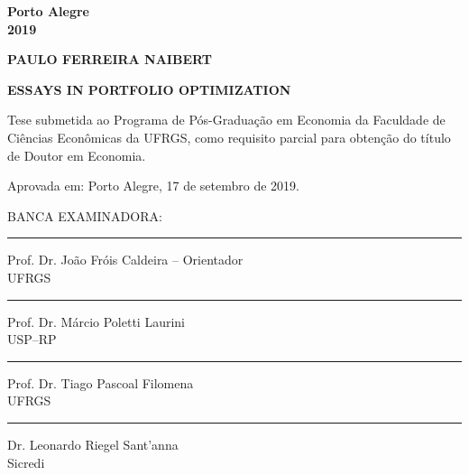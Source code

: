 \documentclass[12pt,oneside,a4paper]{memoir}
\begin{document}
\begin{center}
\textbf{Porto Alegre
\\
2019}
\end{center}

\clearpage
% 

\clearpage

\begin{center}
\textbf{PAULO FERREIRA NAIBERT}
\end{center}

\vspace{3 em}

\begin{center}
\textbf{ESSAYS IN PORTFOLIO OPTIMIZATION}
\end{center}

\vspace{3 em}
\hfill  
\begin{minipage}{.5\textwidth}
\begin{SingleSpace}
Tese submetida ao Programa de Pós-Graduação em Economia da Faculdade de Ciências Econômicas da UFRGS, como requisito parcial para obtenção do título de Doutor em Economia.
\end{SingleSpace}
\end{minipage}
\vfill

\noindent
Aprovada em: Porto Alegre, 17 de setembro de 2019.\\

\vfill

\noindent
BANCA EXAMINADORA:
%

\noindent
\rule{\textwidth}{1pt}
Prof. Dr. João Fróis Caldeira -- Orientador\\
UFRGS

\noindent
\rule{\textwidth}{1pt}
Prof. Dr. Márcio Poletti Laurini\\
USP--RP

\noindent
\rule{\textwidth}{1pt}
Prof. Dr. Tiago Pascoal Filomena\\
UFRGS

\noindent
\rule{\textwidth}{1pt}
Dr. Leonardo Riegel Sant'anna\\
Sicredi\\

\clearpage
\end{document}
